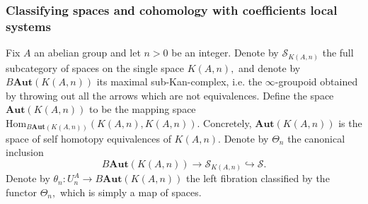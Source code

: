 \documentclass[12pt]{amsart}
\theoremstyle{definition}
\newcommand{\cS}{\mathcal{S}}
\newcommand{\Hom}{\mathrm{Hom}}
\renewcommand{\i}{\infty}
\def\Aut{\mathbf{Aut}}
\begin{document}
\subsubsection{Classifying spaces and cohomology with coefficients local systems}
Fix $A$ an abelian group and let $n>0$ be an integer. Denote by $\cS_{K\left(A,n\right)}$ the full subcategory of spaces on the single space $K\left(A,n\right),$ and denote by $B\Aut\left(K\left(A,n\right)\right)$ its maximal sub-Kan-complex, i.e. the $\i$-groupoid obtained by throwing out all the arrows which are not equivalences. Define 
the space $\Aut\left(K\left(A,n\right)\right)$ to be the mapping space $\Hom_{B\Aut\left(K\left(A,n\right)\right)}\left(K\left(A,n\right),K\left(A,n\right)\right).$ Concretely, $\Aut\left(K\left(A,n\right)\right)$ is the space of self homotopy equivalences of $K\left(A,n\right).$ Denote by $\Theta_n$ the canonical inclusion
$$B\Aut\left(K\left(A,n\right)\right) \to \cS_{K\left(A,n\right)} \hookrightarrow \cS.$$ 
Denote by $\theta_n:U_n^A \to B\Aut\left(K\left(A,n\right)\right)$ the left fibration classified by the functor $\Theta_n,$ which is simply a map of spaces.
\end{document}
